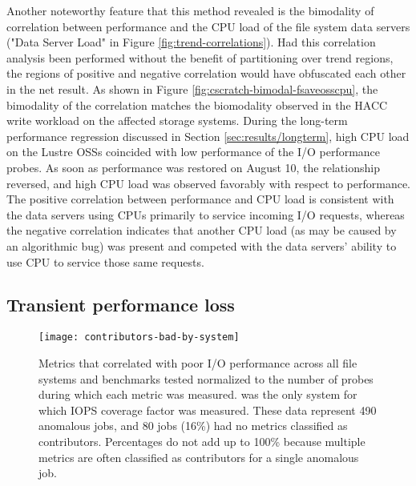 Another noteworthy feature that this method revealed is the bimodality of correlation between performance and the CPU load of the file system data servers ("Data Server Load" in Figure \ref{fig:trend-correlations}).
Had this correlation analysis been performed without the benefit of partitioning over trend regions, the regions of positive and negative correlation would have obfuscated each other in the net result.
As shown in Figure \ref{fig:cscratch-bimodal-fsaveosscpu}, the bimodality of the correlation matches the biomodality observed in the HACC write workload on the affected storage systems.
During the long-term performance regression discussed in Section \ref{sec:results/longterm}, high CPU load on the Lustre OSSs coincided with low performance of the I/O performance probes.
As soon as performance was restored on August 10, the relationship reversed, and high CPU load was observed favorably with respect to performance.
The positive correlation between performance and CPU load is consistent with the data servers using CPUs primarily to service incoming I/O requests, whereas the negative correlation indicates that another CPU load (as may be caused by an algorithmic bug) was present and competed with the data servers' ability to use CPU to service those same requests.


\subsection{Transient performance loss} \label{sec:results/shortterm}



\begin{figure}
    \centering
    \texttt{[image: contributors-bad-by-system]}
    \vspace{-.35in}
    \caption{Metrics that correlated with poor I/O performance across all file systems and benchmarks tested normalized to the number of probes during which each metric was measured.
    \mira was the only system for which IOPS coverage factor was measured. 
    These data represent 490 anomalous jobs, and 80 jobs (16\%) had no metrics classified as contributors.
    Percentages do not add up to 100\% because multiple metrics are often classified as contributors for a single anomalous job.
    }
    \label{fig:contributors-bad-by-system}
\end{figure}

